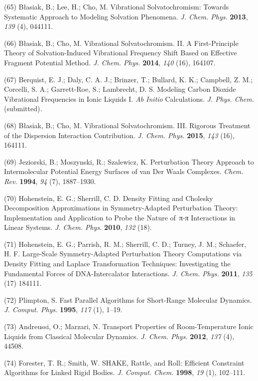 \documentclass[]{article}
\begin{document}
(65) Błasiak, B.; Lee, H.; Cho, M. Vibrational Solvatochromism: Towards
Systematic Approach to Modeling Solvation Phenomena. \emph{J. Chem.
Phys.} \textbf{2013}, \emph{139} (4), 044111.

(66) Błasiak, B.; Cho, M. Vibrational Solvatochromism. II. A
First-Principle Theory of Solvation-Induced Vibrational Frequency Shift
Based on Effective Fragment Potential Method. \emph{J. Chem. Phys.}
\textbf{2014}, \emph{140} (16), 164107.

(67) Berquist, E. J.; Daly, C. A. J.; Brinzer, T.; Bullard, K. K.;
Campbell, Z. M.; Corcelli, S. A.; Garrett-Roe, S.; Lambrecht, D. S.
Modeling Carbon Dioxide Vibrational Frequencies in Ionic Liquids I.
\emph{Ab Initio} Calculations. \emph{J. Phys. Chem.} (submitted)\emph{.}

(68) Błasiak, B.; Cho, M. Vibrational Solvatochromism. III. Rigorous
Treatment of the Dispersion Interaction Contribution. \emph{J. Chem.
Phys.} \textbf{2015}, \emph{143} (16), 164111.

(69) Jeziorski, B.; Moszynski, R.; Szalewicz, K. Perturbation Theory
Approach to Intermolecular Potential Energy Surfaces of van Der Waals
Complexes. \emph{Chem. Rev.} \textbf{1994}, \emph{94} (7), 1887--1930.

(70) Hohenstein, E. G.; Sherrill, C. D. Density Fitting and Cholesky
Decomposition Approximations in Symmetry-Adapted Perturbation Theory:
Implementation and Application to Probe the Nature of\, π-π Interactions
in Linear Systems. \emph{J. Chem. Phys.} \textbf{2010}, \emph{132} (18).

(71) Hohenstein, E. G.; Parrish, R. M.; Sherrill, C. D.; Turney, J. M.;
Schaefer, H. F. Large-Scale Symmetry-Adapted Perturbation Theory
Computations via Density Fitting and Laplace Transformation Techniques:
Investigating the Fundamental Forces of DNA-Intercalator Interactions.
\emph{J. Chem. Phys.} \textbf{2011}, \emph{135} (17) 184111.

(72) Plimpton, S. Fast Parallel Algorithms for Short-Range Molecular
Dynamics. \emph{J. Comput. Phys.} \textbf{1995}, \emph{117} (1), 1--19.

(73) Andreussi, O.; Marzari, N. Transport Properties of Room-Temperature
Ionic Liquids from Classical Molecular Dynamics. \emph{J. Chem. Phys.}
\textbf{2012}, \emph{137} (4), 44508.

(74) Forester, T. R.; Smith, W. SHAKE, Rattle, and Roll: Efficient
Constraint Algorithms for Linked Rigid Bodies. \emph{J. Comput. Chem.}
\textbf{1998}, \emph{19} (1), 102--111.
\end{document}
